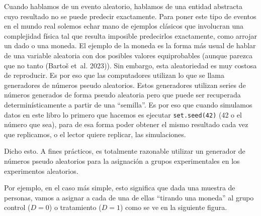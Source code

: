 \documentclass[
  letterpaper,
  DIV=11,
  numbers=noendperiod,
  oneside]{scrreprt}
\begin{document}
\begin{tcolorbox}[enhanced jigsaw, breakable, rightrule=.15mm, colbacktitle=quarto-callout-warning-color!10!white, bottomtitle=1mm, arc=.35mm, titlerule=0mm, left=2mm, toprule=.15mm, leftrule=.75mm, colback=white, opacitybacktitle=0.6, opacityback=0, colframe=quarto-callout-warning-color-frame, bottomrule=.15mm, coltitle=black, toptitle=1mm, title={Sobre la aleatoridad de las computadoras}]
Cuando hablamos de un evento aleatorio, hablamos de una entidad
abstracta cuyo resultado no se puede predecir exactamente. Para poner
este tipo de eventos en el mundo real solemos echar mano de ejemplos
clásicos que involucran una complejidad física tal que resulta imposible
predecirlos exactamente, como arrojar un dado o una moneda. El ejemplo
de la moneda es la forma más usual de hablar de una variable aleatoria
con dos posibles valores equiprobables (aunque parezca que no tanto
(Bartoš et~al.
2023)).
Sin embargo, esta aleatoriedad es muy costosa de reproducir. Es por eso
que las computadores utilizan lo que se llama generadores de números
pseudo aleatorios.
Estos generadores utilizan series de números generados de forma pseudo
aleatoria pero que puede ser recuperada determinísticamente a partir de
una ``semilla''. Es por eso que cuando simulamos datos en este libro lo
primero que hacemos es ejecutar \texttt{set.seed(42)} (42 o el número
que sea), para de esa forma poder obtener el mismo resultado cada vez
que replicamos, o el lector quiere replicar, las simulaciones.

Dicho esto. A fines prácticos, es totalmente razonable utilizar un
generador de números pseudo aleatorios para la asignación a grupos
experimentales en los experimentos aleatorios.
\end{tcolorbox}

Por ejemplo, en el caso más simple, esto significa que dada una muestra
de personas, vamos a asignar a cada de una de ellas ``tirando una
moneda'' al grupo control (\(D=0\)) o tratamiento (\(D=1\)) como se ve
en la siguiente figura.
\end{document}
